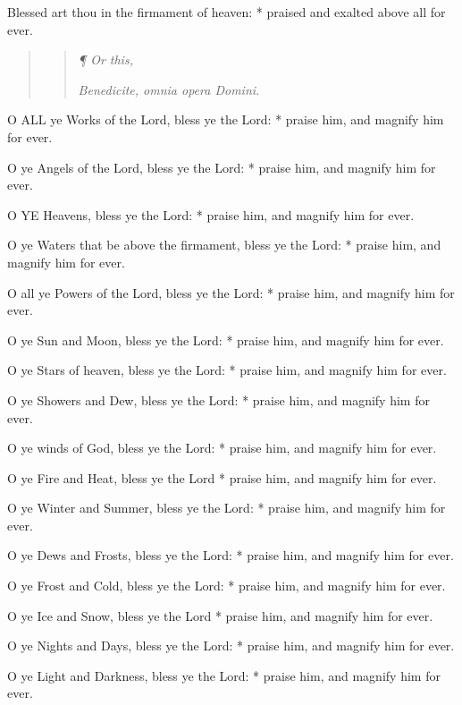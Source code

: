 Blessed art thou in the firmament of heaven: * praised
and exalted above all for ever.

\begin{quote}

\begin{quote}

\emph{¶
Or this,}

\emph{Benedicite,
omnia opera Domini.}

\end{quote}

\end{quote}

O
ALL ye Works of the Lord, bless ye the Lord: * praise him, and magnify
him for ever.

O ye Angels of the Lord, bless ye the Lord: * praise
him, and magnify him for ever.

O
YE Heavens, bless ye the Lord: * praise him, and magnify him for ever.

O ye Waters that be above the firmament, bless ye the
Lord: * praise him, and magnify him for ever.

O all ye Powers of the Lord, bless ye the Lord: * praise
him, and magnify him for ever.

O ye Sun and Moon, bless ye the Lord: * praise him,
and magnify him for ever.

O ye Stars of heaven, bless ye the Lord: * praise him,
and magnify him for ever.

O ye Showers and Dew, bless ye the Lord: * praise him,
and magnify him for ever.

O ye winds of God, bless ye the Lord: * praise him,
and magnify him for ever.

O ye Fire and Heat, bless ye the Lord * praise him,
and magnify him for ever.

O ye Winter and Summer, bless ye the Lord: * praise
him, and magnify him for ever.

O ye Dews and Frosts, bless ye the Lord: * praise him,
and magnify him for ever.

O ye Frost and Cold, bless ye the Lord: * praise him,
and magnify him for ever.

O ye Ice and Snow, bless ye the Lord * praise him,
and magnify him for ever.

O ye Nights and Days, bless ye the Lord: * praise him,
and magnify him for ever.

O ye Light and Darkness, bless ye the Lord: * praise
him, and magnify him for ever.

